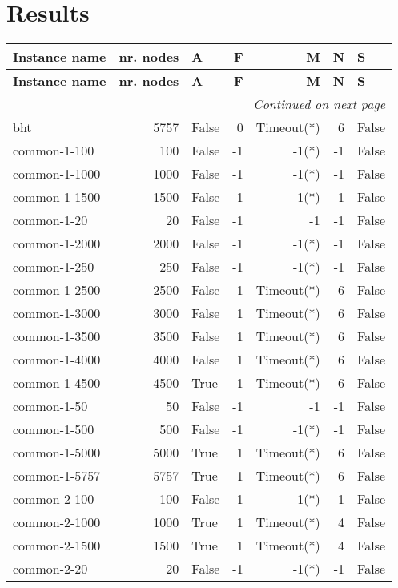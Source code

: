 \section{Results}
\begin{longtable}{lrlrrrl}\toprule \textbf{Instance name}& \textbf{nr. nodes}& \textbf{A}& \textbf{F}& \textbf{M}& \textbf{N}& \textbf{S}\\
\midrule
\endfirsthead
\toprule
 \textbf{Instance name}& \textbf{nr. nodes}& \textbf{A}& \textbf{F}& \textbf{M}& \textbf{N}& \textbf{S}\\
\midrule
\endhead
\midrule
\multicolumn{7}{r}{\textit{Continued on next page}} \\
\midrule
\endfoot
\bottomrule
\endlastfoot
bht & 5757 & False & 0 & Timeout(*) & 6 & False \\
common-1-100 & 100 & False & -1 & -1(*) & -1 & False \\
common-1-1000 & 1000 & False & -1 & -1(*) & -1 & False \\
common-1-1500 & 1500 & False & -1 & -1(*) & -1 & False \\
common-1-20 & 20 & False & -1 & -1 & -1 & False \\
common-1-2000 & 2000 & False & -1 & -1(*) & -1 & False \\
common-1-250 & 250 & False & -1 & -1(*) & -1 & False \\
common-1-2500 & 2500 & False & 1 & Timeout(*) & 6 & False \\
common-1-3000 & 3000 & False & 1 & Timeout(*) & 6 & False \\
common-1-3500 & 3500 & False & 1 & Timeout(*) & 6 & False \\
common-1-4000 & 4000 & False & 1 & Timeout(*) & 6 & False \\
common-1-4500 & 4500 & True & 1 & Timeout(*) & 6 & False \\
common-1-50 & 50 & False & -1 & -1 & -1 & False \\
common-1-500 & 500 & False & -1 & -1(*) & -1 & False \\
common-1-5000 & 5000 & True & 1 & Timeout(*) & 6 & False \\
common-1-5757 & 5757 & True & 1 & Timeout(*) & 6 & False \\
common-2-100 & 100 & False & -1 & -1(*) & -1 & False \\
common-2-1000 & 1000 & True & 1 & Timeout(*) & 4 & False \\
common-2-1500 & 1500 & True & 1 & Timeout(*) & 4 & False \\
common-2-20 & 20 & False & -1 & -1(*) & -1 & False \\

\end{longtable}
